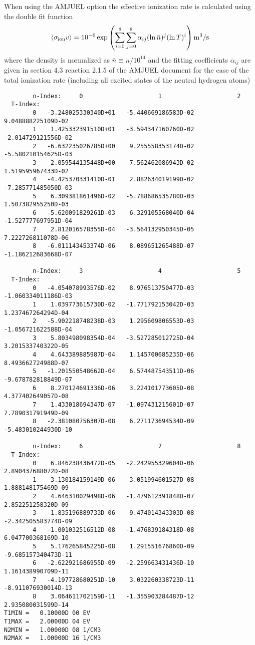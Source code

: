 \documentclass[amsmath,amssymb,a4]{revtex4-2}
\begin{document}
When using the AMJUEL option the effective ionization rate is calculated using the double fit function
\begin{equation}\label{ionization_AMJUEL}
    \langle\sigma_{\rm ion} v\rangle = 10^{-6} \exp\left( \sum_{i=0}^8\sum_{j=0}^8 \alpha_{ij} (\ln \bar n)^j (\ln T)^i \right)  {\rm m}^3/{\rm s}
\end{equation}
where the density is normalized as $\bar n \equiv n / 10^{14}$ and the fitting coefficients $\alpha_{ij}$ are given in section 4.3 reaction 2.1.5 of the AMJUEL document for the case of the total ionization rate (including all excited states of the neutral hydrogen atoms)
\begin{small}\begin{verbatim}
        n-Index:     0                     1                     2
  T-Index:
        0   -3.248025330340D+01   -5.440669186583D-02    9.048888225109D-02
        1    1.425332391510D+01   -3.594347160760D-02   -2.014729121556D-02
        2   -6.632235026785D+00    9.255558353174D-02   -5.580210154625D-03
        3    2.059544135448D+00   -7.562462086943D-02    1.519595967433D-02
        4   -4.425370331410D-01    2.882634019199D-02   -7.285771485050D-03
        5    6.309381861496D-02   -5.788686535780D-03    1.507382955250D-03
        6   -5.620091829261D-03    6.329105568040D-04   -1.527777697951D-04
        7    2.812016578355D-04   -3.564132950345D-05    7.222726811078D-06
        8   -6.011143453374D-06    8.089651265488D-07   -1.186212683668D-07

        n-Index:     3                     4                     5
  T-Index:
        0   -4.054078993576D-02    8.976513750477D-03   -1.060334011186D-03
        1    1.039773615730D-02   -1.771792153042D-03    1.237467264294D-04
        2   -5.902218748238D-03    1.295609806553D-03   -1.056721622588D-04
        3    5.803498098354D-04   -3.527285012725D-04    3.201533740322D-05
        4    4.643389885987D-04    1.145700685235D-06    8.493662724988D-07
        5   -1.201550548662D-04    6.574487543511D-06   -9.678782818849D-07
        6    8.270124691336D-06    3.224101773605D-08    4.377402649057D-08
        7    1.433018694347D-07   -1.097431215601D-07    7.789031791949D-09
        8   -2.381080756307D-08    6.271173694534D-09   -5.483010244930D-10

        n-Index:     6                     7                     8
  T-Index:
        0    6.846238436472D-05   -2.242955329604D-06    2.890437688072D-08
        1   -3.130184159149D-06   -3.051994601527D-08    1.888148175469D-09
        2    4.646310029498D-06   -1.479612391848D-07    2.852251258320D-09
        3   -1.835196889733D-06    9.474014343303D-08   -2.342505583774D-09
        4   -1.001032516512D-08   -1.476839184318D-08    6.047700368169D-10
        5    5.176265845225D-08    1.291551676860D-09   -9.685157340473D-11
        6   -2.622921686955D-09   -2.259663431436D-10    1.161438990709D-11
        7   -4.197728680251D-10    3.032260338723D-11   -8.911076930014D-13
        8    3.064611702159D-11   -1.355903284487D-12    2.935080031599D-14
T1MIN =   0.10000D 00 EV
T1MAX =   2.00000D 04 EV
N2MIN =   1.00000D 08 1/CM3
N2MAX =   1.00000D 16 1/CM3
\end{verbatim}\end{small}
\end{document}
